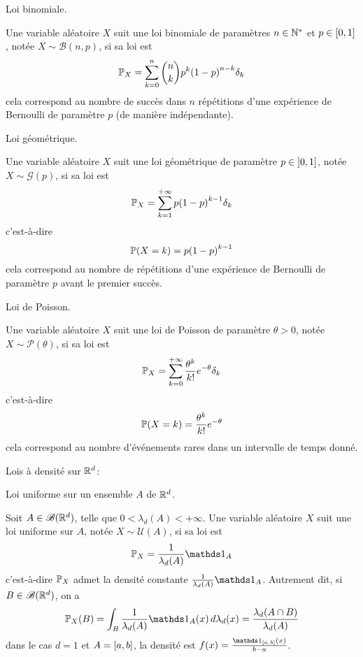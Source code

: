 Loi binomiale.

Une variable aléatoire \(X\) suit une loi binomiale de paramètres \(n\in\mathbb{N}^\ast\) et \(p\in\mathopen{}\left[0,1\right]\mathclose{}\), notée \(X\sim\mathcal B(n,p)\), si sa loi est
\begin{equation*}
    \mathbb{P}_X = \sum_{k=0}^n\binom{n}{k}p^k{(1-p)}^{n-k}\delta_k
\end{equation*}
cela correspond au nombre de succès dans \(n\) répétitions d'une expérience de Bernoulli de paramètre \(p\) (de manière indépendante).


Loi géométrique.

Une variable aléatoire \(X\) suit une loi géométrique de paramètre \(p\in\mathopen{}\left]0,1\right]\mathclose{}\), notée \(X\sim\mathcal G(p)\), si sa loi est
\begin{equation*}
    \mathbb{P}_X = \sum_{k=1}^{+\infty}p{(1-p)}^{k-1}\delta_k
\end{equation*}
c'est-à-dire
\begin{equation*}
    \mathbb{P}(X=k) = p{(1-p)}^{k-1}
\end{equation*}
cela correspond au nombre de répétitions d'une expérience de Bernoulli de paramètre \(p\) avant le premier succès.


Loi de Poisson.

Une variable aléatoire \(X\) suit une loi de Poisson de paramètre \(\theta>0\), notée \(X\sim\mathcal P(\theta)\), si sa loi est
\begin{equation*}
    \mathbb{P}_X = \sum_{k=0}^{+\infty}\frac{\theta^k}{k!}e^{-\theta}\delta_k
\end{equation*}
c'est-à-dire
\begin{equation*}
    \mathbb{P}(X=k) = \frac{\theta^k}{k!}e^{-\theta}
\end{equation*}
cela correspond au nombre d'événements rares dans un intervalle de temps donné.


Lois à densité sur \(\mathbb{R}^d\):


Loi uniforme sur un ensemble \(A\) de \(\mathbb{R}^d\).

Soit \(A\in\mathscr{B}(\mathbb{R}^d)\), telle que \(0<\lambda_d(A)<+\infty\). 
Une variable aléatoire \(X\) suit une loi uniforme sur \(A\), notée \(X\sim\mathcal U(A)\), si sa loi est
\begin{equation*}
    \bb P_X = \frac{1}{\lambda_d(A)}\one_A
\end{equation*}
c'est-à-dire \(\mathbb{P}_X\) admet la densité constante \(\frac{1}{\lambda_d(A)}\one_A\). Autrement dit,
si \(B\in\mathscr{B}(\mathbb{R}^d)\), on a
\begin{equation*}
    \bb P_X(B) = \int_B \frac{1}{\lambda_d(A)}\one_A(x)\der\lambda_d(x) = \frac{\lambda_d(A\cap B)}{\lambda_d(A)}
\end{equation*}
dans le cas \(d=1\) et \(A = \mathopen{}\left[a,b\right]\mathclose{}\), la densité est \(f(x) = \frac{\one_{\ff{a,b}}(x)}{b-a}\).


